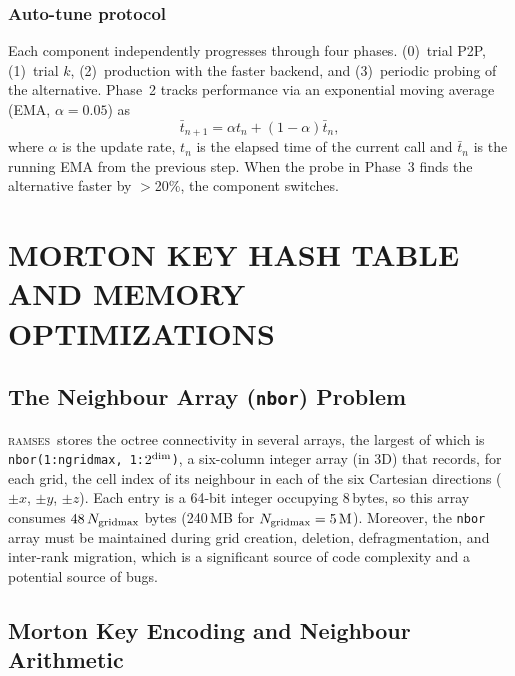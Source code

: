 \documentclass[fleqn,usenatbib]{mnras}
\newcommand{\ramses}{\textsc{ramses}}
\newcommand{\ngridmax}{N_{\rm gridmax}}
\newcommand{\ksec}{\ensuremath{k}\text{-section}}
\newcommand{\code}[1]{\texttt{#1}}
\begin{document}
\subsubsection{Auto-tune protocol}
\label{sec:autotune_protocol}

Each component independently progresses through four phases. (0)~trial
P2P, (1)~trial \ksec, (2)~production with the faster backend, and
(3)~periodic probing of the alternative.  Phase~2 tracks performance
via an exponential moving average (EMA, $\alpha = 0.05$) as
\begin{equation}
	\bar{t}_{n+1} = \alpha t_n + (1-\alpha) \bar{t}_n,
\end{equation} 
where $\alpha$ is the update rate, $t_n$ is the elapsed time of the current call and $\bar{t}_n$ is
the running EMA from the previous step.
When the
probe in Phase~3 finds the alternative faster by $>$20\%, the
component switches. 


\section{MORTON KEY HASH TABLE AND MEMORY OPTIMIZATIONS}
\label{sec:morton}

\subsection{The Neighbour Array (\texttt{nbor}) Problem}
\label{sec:morton_problem}

\ramses\ stores the octree connectivity in several arrays, the largest
of which is \code{nbor(1:ngridmax, 1:$2^{\rm dim}$)}, a six-column
integer array (in 3D) that records, for each grid, the cell index of its
neighbour in each of the six Cartesian directions ($\pm x$, $\pm y$,
$\pm z$). Each entry is a 64-bit integer occupying 8\,bytes, so this
array consumes $48\,\ngridmax$ bytes (240\,MB for
$\ngridmax = 5\,\mathrm{M}$).
Moreover, the \code{nbor} array must be maintained during grid creation,
deletion, defragmentation, and inter-rank migration, which is a significant
source of code complexity and a potential source of bugs.


\subsection{Morton Key Encoding and Neighbour Arithmetic}
\label{sec:morton_encoding}
\end{document}
